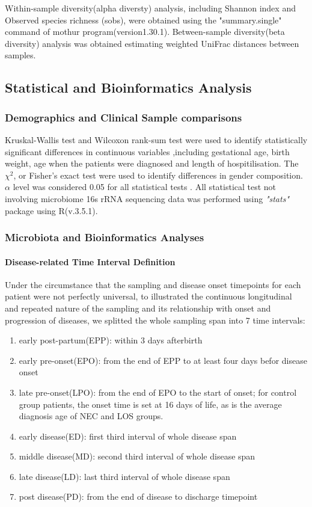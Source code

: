 \documentclass[fleqn,10pt,lineno]{wlpeerj} %
\begin{document}
  \noindent
   Within-sample diversity(alpha diversty) analysis, including Shannon index and Observed species richness (sobs), were obtained using the "summary.single" command of mothur program(version1.30.1)\citep{schloss2009introducing}. Between-sample diversity(beta diversity) analysis was obtained estimating weighted UniFrac distances between samples.

  \subsection*{Statistical and Bioinformatics Analysis}
    \subsubsection*{Demographics and Clinical Sample comparisons}
    Kruskal-Wallis test and Wilcoxon rank-sum test were used to identify statistically significant differences in continuous variables ,including gestational age, birth weight, age when the patients were diagnosed and length of hospitilisation. The $\chi^2$, or Fisher's exact test were used to identify differences in gender composition. $\alpha$ level was considered 0.05 for all statistical tests . All statistical test not involving microbiome 16s rRNA sequencing data was performed using \textit{"stats"} package using R(v.3.5.1).
    \subsubsection*{Microbiota and Bioinformatics Analyses}
      \paragraph*{Disease-related Time Interval Definition}
      Under the circumstance that the sampling and disease onset timepoints for each patient were not perfectly universal, to illustrated the continuous longitudinal and repeated nature of the sampling and its relationship with onset and progression of diseases, we splitted the whole sampling span into 7 time intervals:
        \begin{enumerate}[noitemsep]
          \item early post-partum(EPP): within 3 days afterbirth
          \item early pre-onset(EPO): from the end of EPP to at least four days befor disease onset
          \item late pre-onset(LPO): from the end of EPO to the start of onset; for control group patients, the onset time is set at 16 days of life, as is the average diagnosis age of NEC and LOS groups.
          \item early disease(ED): first third interval of whole disease span
          \item middle disease(MD): second third interval of whole disease span
          \item late disease(LD): last third interval of whole disease span
          \item post disease(PD): from the end of disease to discharge timepoint
        \end{enumerate}
\end{document}
